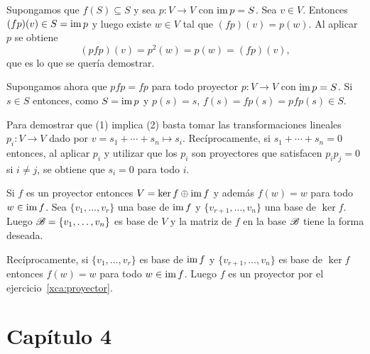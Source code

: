 \begin{solution}[ejercicio~\ref{xca:pfp=fp}]
	Supongamos que $f(S)\subseteq S$ y sea $p\colon V\to V$ con $\operatorname{im} p=S$. Sea
	$v\in V$. Entonces $(fp)(v)\in S=\operatorname{im} p$ y luego existe $w\in V$ tal que
	$(fp)(v)=p(w)$. Al aplicar $p$ se obtiene
	\[
	(pfp)(v)=p^2(w)=p(w)=(fp)(v),
	\]
	que es lo que se quería demostrar.

	Supongamos ahora que $pfp=fp$ para todo proyector $p\colon V\to V$ con $\operatorname{im}
	p=S$. Si $s\in S$ entonces, como $S=\operatorname{im} p$ y $p(s)=s$,
	$f(s)=fp(s)=pfp(s)\in S$. 
\end{solution}

\begin{solution}
	Para demostrar que (1) implica (2) basta tomar las transformaciones
	lineales $p_i\colon V\to V$ dado por $v=s_1+\cdots+s_n\mapsto s_i$.
	Recíprocamente, si $s_1+\cdots+s_n=0$ entonces, al aplicar $p_i$ y utilizar
	que los $p_i$ son proyectores que satisfacen $p_ip_j=0$ si $i\ne j$, se
	obtiene que $s_i=0$ para todo $i$.
\end{solution}

\begin{solution}
	Si $f$ es un proyector entonces $V=\ker f\oplus\operatorname{im} f$ y además $f(w)=w$
	para todo $w\in\operatorname{im} f$.  Sea $\{v_1,\dots,v_r\}$ una base de $\operatorname{im} f$ y
	$\{v_{r+1},\dots,v_n\}$ una base de $\ker f$.  Luego
	$\mathscr{B}=\{v_1,\dots,v_n\}$ es base de $V$ y la matriz de $f$ en la base $\mathscr{B}$
	tiene la forma deseada.

	Recíprocamente, si $\{v_1,\dots,v_r\}$ es base de $\operatorname{im} f$ y
	$\{v_{r+1},\dots,v_n\}$ es base de $\ker f$ entonces $f(w)=w$ para todo
	$w\in\operatorname{im} f$. Luego $f$ es un proyector por el
	ejercicio~\ref{xca:proyector}.
\end{solution}

\section{Capítulo 4}

